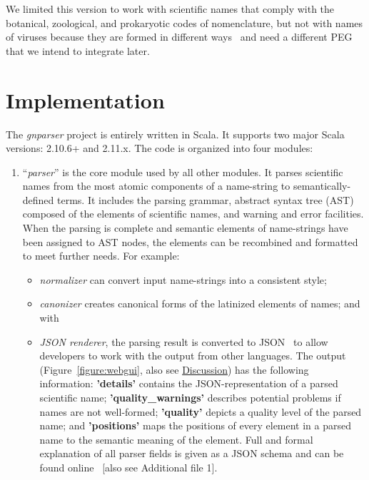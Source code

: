 \documentclass{bmcart}
\begin{document}
We limited this version to work with scientific names that comply with the botanical, zoological, and prokaryotic codes of nomenclature, but not with names of viruses because they are formed in different ways~\cite{ICTV, Patterson2016} and need a different PEG that we intend to integrate later.

\section*{Implementation}

The \textit{gnparser} project is entirely written in Scala. It supports two major Scala versions: 2.10.6+ and 2.11.x. The code is organized into four modules:

\begin{enumerate}

  \item ``\textit{parser}'' is the core module used by all other modules. It parses scientific names from the most atomic components of a name-string to semantically-defined terms. It includes the parsing grammar, abstract syntax tree (AST) composed of the elements of scientific names, and warning and error facilities. When the parsing is complete and semantic elements of name-strings have been assigned to AST nodes, the elements can be recombined and formatted to meet further needs. For example:

\begin{itemize}

  \item \textit{normalizer} can convert input name-strings into a consistent style;

  \item \textit{canonizer} creates canonical forms of the latinized elements of names; and with

  \item \textit{JSON renderer}, the parsing result is converted to JSON~\cite{bray2014javascript} to allow developers to work with the output from other languages. The output (Figure~\ref{figure:webgui}, also see \hyperref[sec:discussion]{Discussion}) has the following information: \textbf{'details'} contains the JSON-representation of a parsed scientific name; \textbf{'quality\_warnings'} describes potential problems if names are not well-formed; \textbf{'quality'} depicts a quality level of the parsed name; and \textbf{'positions'} maps the positions of every element in a parsed name to the semantic meaning of the element. Full and formal explanation of all parser fields is given as a JSON schema and can be found online~\cite{gnparser-json} [also see Additional file 1].


\end{itemize}
\end{enumerate}
\end{document}
